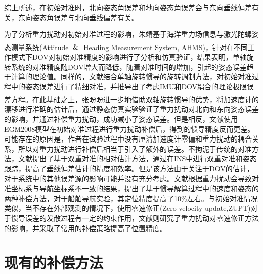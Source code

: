 \documentclass[12pt,a4,utf8]{article}
\newcommand{\upcite}[1]{\textsuperscript{\textsuperscript{\cite{#1}}}} %
\begin{document}
综上所述，在初始对准时，北向姿态角误差和地向姿态角误差会与东向垂线偏差有关，东向姿态角误差与北向垂线偏差有关。

为了分析重力扰动对初始对准过程的影响，朱靖基于海洋重力场信息与激光陀螺姿态测量系统(Attitude $\And$ Heading Measurement System, AHMS)\upcite{1020386196.nh}，针对在不同工作模式下DOV对初始对准精度的影响进行了分析和仿真验证，结果表明，单轴旋转系统的对准精度随DOV增大而降低，随着对准时间的增加，引起的姿态误差趋于计算的理论值。同样的，文献\cite{hao2022analysis}结合单轴旋转惯导的旋转调制方法，对初始对准过程中的姿态误差进行了精细对准，并推导出了考虑IMU和DOV耦合的理论极限误差方程。在此基础之上，张盼盼进一步地借助双轴旋转惯导的优势\upcite{zhang2023gravity}，将加速度计的漂移进行准确的估计后，通过静态仿真实验验证了重力扰动对北向和东向姿态误差的影响，并通过补偿重力扰动，成功减小了姿态误差。但是相反，文献\cite{TIE2017impact}使用EGM2008模型在初始对准过程进行重力扰动补偿后，得到的惯导精度反而更差。可能存在的原因是，作者在试验过程中没有厘清加速度计零偏和重力扰动的耦合关系，所以对重力扰动进行补偿后相当于引入了额外的误差。不拘泥于传统的对准方法，文献\cite{hao2022relative}提出了基于双重对准的相对估计方法，通过在INS中进行双重对准和姿态跟踪，提高了垂线偏差估计的精度和效率。但是该方法由于关注于DOV的估计，对于系统中的其他误差源的影响可能并没有充分考虑。文献\cite{tie2018compensation}根据重力扰动会导致对准坐标系与导航坐标系不一致的结果，提出了基于惯导解算过程中的速度和姿态的两种补偿方法，对于船舶导航实验，其定位精度提高了10\%左右。与初始对准情况类似，当不存在外部观测的情况下，使用零速修正(Zero velocity update,ZUPT)对于惯导误差的发散过程有一定的约束作用，文献\cite{Wumingqiang2023}\cite{weng2020analysis}则研究了重力扰动对零速修正方法的影响，并采取了常用的补偿策略提高了位置精度。

\section{现有的补偿方法}
\end{document}
